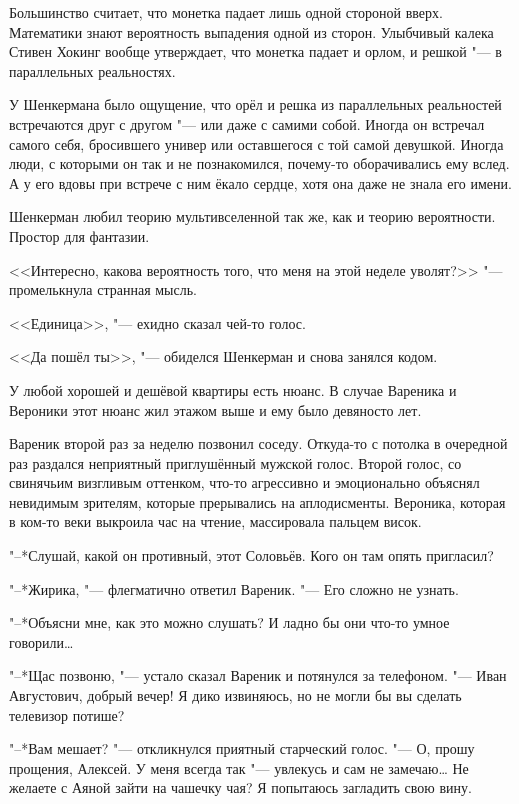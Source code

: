 Большинство считает, что монетка падает лишь одной стороной вверх.
Математики знают вероятность выпадения одной из сторон.
Улыбчивый калека Стивен Хокинг вообще утверждает, что монетка падает и орлом, и решкой "--- в параллельных реальностях.

У Шенкермана было ощущение, что орёл и решка из параллельных реальностей встречаются друг с другом "--- или даже с самими собой.
Иногда он встречал самого себя, бросившего универ или оставшегося с той самой девушкой.
Иногда люди, с которыми он так и не познакомился, почему-то оборачивались ему вслед.
А у его вдовы при встрече с ним ёкало сердце, хотя она даже не знала его имени.

Шенкерман любил теорию мультивселенной так же, как и теорию вероятности.
Простор для фантазии.

<<Интересно, какова вероятность того, что меня на этой неделе уволят?>> "--- промелькнула странная мысль.

<<Единица>>, "--- ехидно сказал чей-то голос.

<<Да пошёл ты>>, "--- обиделся Шенкерман и снова занялся кодом.

\asterism

У любой хорошей и дешёвой квартиры есть нюанс.
В случае Вареника и Вероники этот нюанс жил этажом выше и ему было девяносто лет.

Вареник второй раз за неделю позвонил соседу.
Откуда-то с потолка в очередной раз раздался неприятный приглушённый мужской голос.
Второй голос, со свинячьим визгливым оттенком, что-то агрессивно и эмоционально объяснял невидимым зрителям, которые прерывались на аплодисменты.
Вероника, которая в ком-то веки выкроила час на чтение, массировала пальцем висок.

"--*Слушай, какой он противный, этот Соловьёв.
Кого он там опять пригласил?

"--*Жирика, "--- флегматично ответил Вареник.
"--- Его сложно не узнать.

"--*Объясни мне, как это можно слушать?
И ладно бы они что-то умное говорили\dots{}

"--*Щас позвоню, "--- устало сказал Вареник и потянулся за телефоном.
"--- Иван Августович, добрый вечер!
Я дико извиняюсь, но не могли бы вы сделать телевизор потише?

"--*Вам мешает? "--- откликнулся приятный старческий голос.
"--- О, прошу прощения, Алексей.
У меня всегда так "--- увлекусь и сам не замечаю\dots{}
Не желаете с Аяной зайти на чашечку чая?
Я попытаюсь загладить свою вину.

